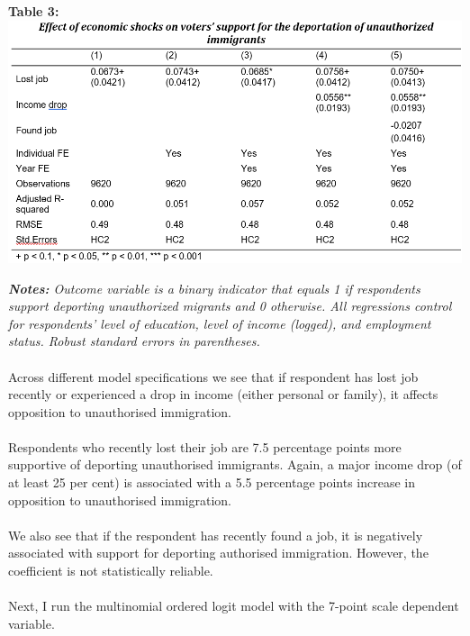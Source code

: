 \documentclass[12pt,letterpaper]{article}
\begin{document}
\begin{center}
	\textbf{Table 3:}
	\includegraphics{Table 2.png} 
\end{center}
\textit{\textbf{Notes:} Outcome variable is a binary indicator that equals 1 if respondents support deporting unauthorized migrants and 0 otherwise. All regressions control for respondents’ level of education, level of income (logged), and employment status. Robust standard errors in parentheses.}\\
\\Across different model specifications we see that if respondent has lost job recently or experienced a drop in income (either personal or family), it affects opposition to unauthorised immigration.\\
\\Respondents who recently lost their job are 7.5 percentage points more supportive of deporting unauthorised immigrants. Again, a major income drop (of at least 25 per cent) is associated with a 5.5 percentage points increase in opposition to unauthorised immigration.\\
\\We also see that if the respondent has recently found a job, it is negatively associated with support for deporting authorised immigration. However, the coefficient is not statistically reliable.\\
\pagebreak
\\Next, I run the multinomial ordered logit model with the 7-point scale dependent variable.

\end{document}
